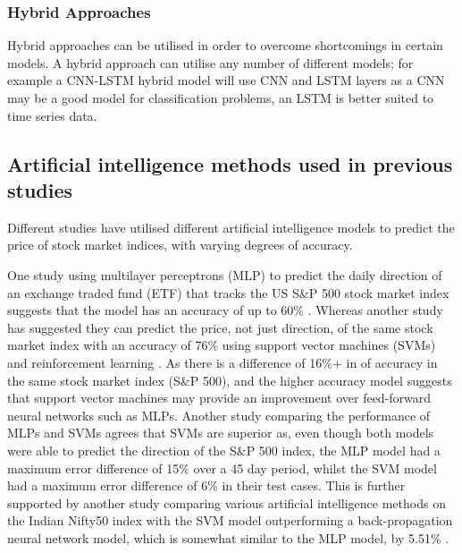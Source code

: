 \subsubsection{Hybrid Approaches}

Hybrid approaches can be utilised in order to overcome shortcomings in certain models. A hybrid
approach can utilise any number of different models; for example a CNN-LSTM hybrid model will use
CNN and LSTM layers as a CNN may be a good model for classification problems, an LSTM is better
suited to time series data.

\subsection{Artificial intelligence methods used in previous studies}

Different studies have utilised different artificial intelligence models to predict the price of stock market indices, with varying degrees of accuracy.

One study using multilayer perceptrons (MLP) to predict the daily direction of an exchange traded fund (ETF) that tracks the US S\&P 500 stock market index suggests that the model has an accuracy of up to 60\% \parencite{zhong2019predicting}. Whereas another study has suggested they can predict the price, not just direction, of the same stock market index with an accuracy of 76\% using support vector machines (SVMs) and reinforcement learning \parencite{shen2012stock}. As there is a difference of 16\%+ in of accuracy in the same stock market index (S\&P 500), and the higher accuracy model suggests that support vector machines may provide an improvement over feed-forward neural networks such as MLPs. Another study comparing the performance of MLPs and SVMs agrees that SVMs are superior as, even though both models were able to predict the direction of the S\&P 500 index, the MLP model had a maximum error difference of 15\% over a 45 day period, whilst the SVM model had a maximum error difference of 6\% in their test cases\parencite{comparisonregannsvm}. %
This is further supported by another study comparing various artificial intelligence methods on the Indian Nifty50 index with the SVM model outperforming a back-propagation neural network model, which is somewhat similar to the MLP model, by 5.51\% \parencite{kumar2006forecasting}.

